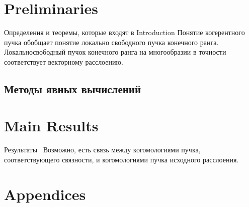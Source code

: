 \documentclass[11pt]{article}
\begin{document}
    \section{Preliminaries} \label{sec:prelim}
       Определения и теоремы, которые входят в Introduction
        Понятие когерентного пучка обобщает понятие локально
       свободного пучка конечного ранга.
        Локальносвободный пучок конечного ранга на многообразии
        в точности соответствует векторному расслоению.
    \subsection{Методы явных вычислений}\label{subsec:методы-явных-вычислений}



    \section{Main Results}\label{sec:main-results}
        Результаты~
    Возможно, есть связь между когомологиями пучка, соответствующего связности,
    и когомологиями пучка исходного расслоения.




    \section{Appendices}\label{sec:appendices}
\end{document}
